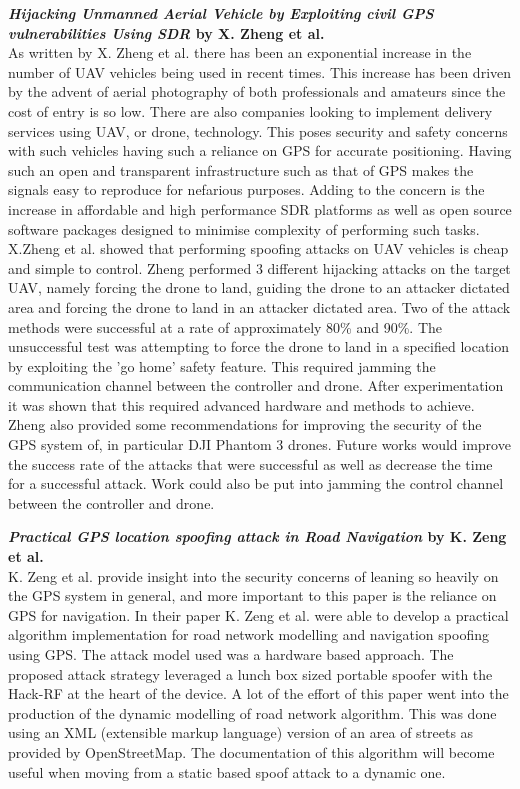 \textbf{\emph{Hijacking Unmanned Aerial Vehicle by Exploiting civil GPS vulnerabilities Using SDR} by X. Zheng et al.}\\
As written by X. Zheng et al. \cite{RN4} there has been an exponential increase in the number of UAV vehicles being used in recent times.
This increase has been driven by the advent of aerial photography of both professionals and amateurs since the cost of entry is so low. There are
also companies looking to implement delivery services using UAV, or drone, technology.
This poses security and safety concerns with such vehicles having such a reliance on GPS for accurate positioning. Having such an open and transparent
infrastructure such as that of GPS makes the signals easy to reproduce for nefarious purposes. Adding to the concern is the increase in 
affordable and high performance SDR platforms as well as open source software packages designed to minimise complexity of performing such tasks. X.Zheng et al.
showed that performing spoofing attacks on UAV vehicles is cheap and simple to control. Zheng performed 3 different hijacking attacks on the target
UAV, namely forcing the drone to land, guiding the drone to an attacker dictated area and forcing the drone to land in an attacker dictated area.
Two of the attack methods were successful at a rate of approximately 80\% and 90\%. The unsuccessful test was attempting to force the drone to land in a specified location by exploiting the 
'go home' safety feature. This required jamming the communication channel between the controller and drone. After experimentation it was shown
that this required advanced hardware and methods to achieve. Zheng also provided some recommendations for improving the security of the GPS system of, in particular
DJI Phantom 3 drones.
Future works would improve the success rate of the attacks that were successful as well as decrease the time for a successful attack. Work could 
also be put into jamming the control channel between the controller and drone.

\medskip

\textbf{\emph{Practical GPS location spoofing attack in Road Navigation} by K. Zeng et al.} \\
K. Zeng et al. provide insight into the security concerns of leaning so heavily on the GPS system in general, and more important to this
paper is the reliance on GPS for navigation. In their paper \cite{RN9} K. Zeng et al. were able to develop a practical algorithm
implementation for road network modelling and navigation spoofing using GPS. The attack model used was a hardware based approach. 
The proposed attack strategy leveraged a lunch box sized portable spoofer with the Hack-RF at the heart of the device. A lot of the effort
of this paper went into the production of the dynamic modelling of road network algorithm. This was done using an XML (extensible markup language)
version of an area of streets as provided by OpenStreetMap. The documentation of this algorithm will become 
useful when moving from a static based spoof attack to a dynamic one.

